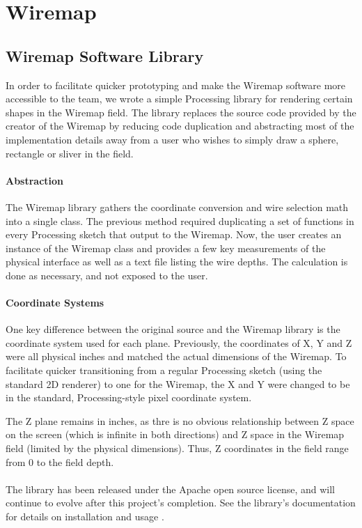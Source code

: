\section{Wiremap}

\subsection{Wiremap Software Library}
In order to facilitate quicker prototyping and make the Wiremap software more accessible to the team, we wrote a simple Processing library for rendering certain shapes in the Wiremap field. The library replaces the source code provided by the creator of the Wiremap \cite{AH} by reducing code duplication and abstracting most of the implementation details away from a user who wishes to simply draw a sphere, rectangle or sliver in the field.

\paragraph{Abstraction}
The Wiremap library gathers the coordinate conversion and wire selection math into a single class. The previous method required duplicating a set of functions in every Processing sketch that output to the Wiremap. Now, the user creates an instance of the Wiremap class and provides a few key measurements of the physical interface as well as a text file listing the wire depths. The calculation is done as necessary, and not exposed to the user.

\paragraph{Coordinate Systems}
One key difference between the original source and the Wiremap library is the coordinate system used for each plane. Previously, the coordinates of X, Y and Z were all physical inches and matched the actual dimensions of the Wiremap. To facilitate quicker transitioning from a regular Processing sketch (using the standard 2D renderer) to one for the Wiremap, the X and Y were changed to be in the standard, Processing-style pixel coordinate system.

The Z plane remains in inches, as thre is no obvious relationship between Z space on the screen (which is infinite in both directions) and Z space in the Wiremap field (limited by the physical dimensions). Thus, Z coordinates in the field range from 0 to the field depth.

\paragraph{}The library has been released under the Apache open source license, and will continue to evolve after this project's completion. See the library's documentation for details on installation and usage \cite{CP}.
